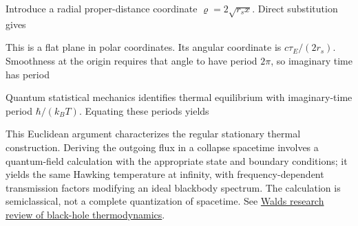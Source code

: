 \documentclass[
  11pt,
  letterpaper,
  oneside,
  openany]{scrbook}
\begin{document}
\begin{center}
\begingroup
{}
\ifdim\wd\grmathbox>\linewidth
\resizebox{\linewidth}{!}{\usebox{\grmathbox}}
\else\usebox{\grmathbox}\fi
\endgroup
\end{center}

Introduce a radial proper-distance coordinate \(\varrho=2\sqrt{r_sx}\).
Direct substitution gives

\begin{center}
\begingroup
{}
\ifdim\wd\grmathbox>\linewidth
\resizebox{\linewidth}{!}{\usebox{\grmathbox}}
\else\usebox{\grmathbox}\fi
\endgroup
\end{center}

This is a flat plane in polar coordinates. Its angular coordinate is
\(c\tau_E/(2r_s)\). Smoothness at the origin requires that angle to have
period \(2\pi\), so imaginary time has period

\begin{center}
\begingroup
{}
\ifdim\wd\grmathbox>\linewidth
\resizebox{\linewidth}{!}{\usebox{\grmathbox}}
\else\usebox{\grmathbox}\fi
\endgroup
\end{center}

Quantum statistical mechanics identifies thermal equilibrium with
imaginary-time period \(\hbar/(k_BT)\). Equating these periods yields

\begin{center}
\begingroup
{}
\ifdim\wd\grmathbox>\linewidth
\resizebox{\linewidth}{!}{\usebox{\grmathbox}}
\else\usebox{\grmathbox}\fi
\endgroup
\end{center}

This Euclidean argument characterizes the regular stationary thermal
construction. Deriving the outgoing flux in a collapse spacetime
involves a quantum-field calculation with the appropriate state and
boundary conditions; it yields the same Hawking temperature at infinity,
with frequency-dependent transmission factors modifying an ideal
blackbody spectrum. The calculation is semiclassical, not a complete
quantization of spacetime. See
\href{https://arxiv.org/abs/gr-qc/9912119}{Wald\textquotesingle s
research review of black-hole thermodynamics}.
\end{document}
